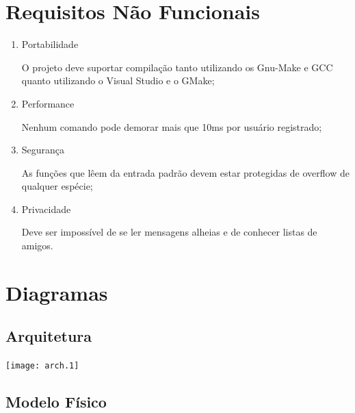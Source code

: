 \documentclass[a4paper,8pt]{article}
\begin{document}
\section{Requisitos Não Funcionais}

\begin{enumerate}


\item Portabilidade

O projeto deve suportar compilação tanto utilizando os Gnu-Make e GCC quanto
utilizando o Visual Studio e o GMake;

\item Performance

Nenhum comando pode demorar mais que 10ms por usuário registrado;

\item Segurança

As funções que lêem da entrada padrão devem estar protegidas de
overflow de qualquer espécie;

\item Privacidade

Deve ser impossível de se ler mensagens alheias e de conhecer listas de
amigos.

\end{enumerate}


\section{Diagramas}
\subsection{Arquitetura}

\texttt{[image: arch.1]}

\subsection{Modelo Físico}
\end{document}
